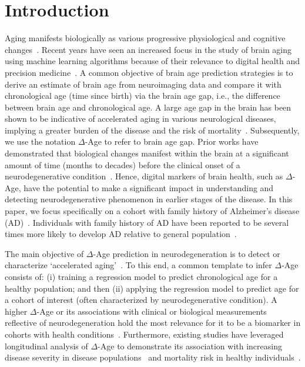 \documentclass[conference]{IEEEtran}
\begin{document}
\section{Introduction}
Aging manifests biologically as various progressive physiological and cognitive changes~\cite{lopez2013hallmarks}. Recent years have seen an increased focus in the study of brain aging using machine learning algorithms because of their relevance to digital health and precision medicine~\cite{baecker2021machine}. A common objective of brain age prediction strategies is to derive an estimate of brain age from neuroimaging data and compare it with chronological age (time since birth) via the brain age gap, i.e., the difference between brain age and chronological age. A large age gap in the brain has been shown to be indicative of accelerated aging in various neurological diseases, implying a greater burden of the disease and the risk of mortality~\cite{jove2014metabolomics}. Subsequently, we use the notation $\Delta$-Age to refer to brain age gap. Prior works have demonstrated that biological changes manifest within the brain at a significant amount of time (months to decades) before the clinical onset of a neurodegenerative condition~\cite{sperling2011toward,benussi2022conceptual}. Hence, digital markers of brain health, such as $\Delta$-Age, have the potential to make a significant impact in understanding and detecting neurodegenerative phenomenon in earlier stages of the disease. In this paper, we focus specifically on a cohort with family history of Alzheimer's disease (AD)~\cite{tremblay2021open}. Individuals with family history of AD have been reported to be several times more likely to develop AD relative to general population~\cite{cannon2019relative}.

The main objective of $\Delta$-Age prediction in neurodegeneration is to detect or characterize `accelerated aging'~\cite{cole2017predicting,franke2019ten}. To this end, a common template to infer $\Delta$-Age consists of: (i) training a regression model to predict chronological age for a healthy population; and then (ii) applying the regression model to predict age for a cohort of interest (often characterized by neurodegenerative condition). A higher $\Delta$-Age or its associations with clinical or biological measurements reflective of neurodegeneration hold the most relevance for it to be a biomarker in cohorts with health conditions~\cite{lee2022deep,elhaik2022principal,sihag2023explainable}. Furthermore, existing studies have leveraged longitudinal analysis of $\Delta$-Age to demonstrate its association with increasing disease severity in disease populations~\cite{franke2012longitudinal, cole2020longitudinal} and mortality risk in healthy individuals~\cite{cole2018brain}.
\end{document}
